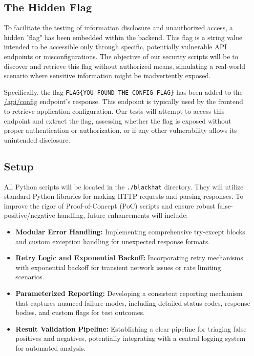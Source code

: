 \documentclass{article}
\begin{document}
\subsection{The Hidden Flag}
To facilitate the testing of information disclosure and unauthorized access, a hidden "flag" has been embedded within the backend. This flag is a string value intended to be accessible only through specific, potentially vulnerable API endpoints or misconfigurations. The objective of our security scripts will be to discover and retrieve this flag without authorized means, simulating a real-world scenario where sensitive information might be inadvertently exposed.

Specifically, the flag \texttt{FLAG\{YOU\_FOUND\_THE\_CONFIG\_FLAG\}} has been added to the \url{/api/config} endpoint's response. This endpoint is typically used by the frontend to retrieve application configuration. Our tests will attempt to access this endpoint and extract the flag, assessing whether the flag is exposed without proper authentication or authorization, or if any other vulnerability allows its unintended disclosure.

\subsection{Setup}
All Python scripts will be located in the \texttt{./blackhat} directory. They will utilize standard Python libraries for making HTTP requests and parsing responses. To improve the rigor of Proof-of-Concept (PoC) scripts and ensure robust false-positive/negative handling, future enhancements will include:
\begin{itemize}
    \item \textbf{Modular Error Handling:} Implementing comprehensive try-except blocks and custom exception handling for unexpected response formats.
    \item \textbf{Retry Logic and Exponential Backoff:} Incorporating retry mechanisms with exponential backoff for transient network issues or rate limiting scenarios.
    \item \textbf{Parameterized Reporting:} Developing a consistent reporting mechanism that captures nuanced failure modes, including detailed status codes, response bodies, and custom flags for test outcomes.
    \item \textbf{Result Validation Pipeline:} Establishing a clear pipeline for triaging false positives and negatives, potentially integrating with a central logging system for automated analysis.
\end{itemize}
\end{document}
